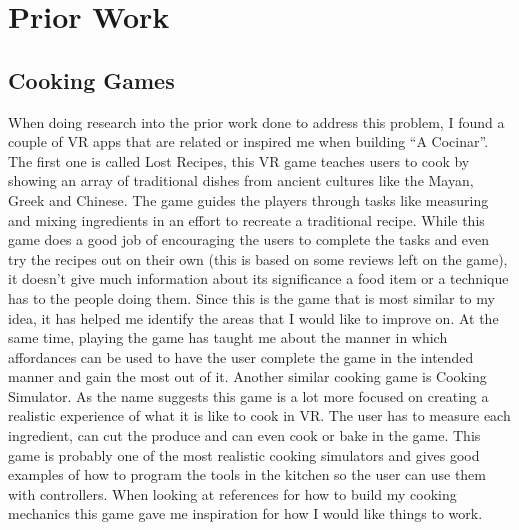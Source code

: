 \documentclass[10pt,twocolumn]{article}
\begin{document}
\section{Prior Work}
\subsection{Cooking Games}
When doing research into the prior work done to address this problem, I found a couple of VR apps that are related or inspired me when building “A Cocinar”. The first one is called Lost Recipes\cite{lostrecipes2022}, this VR game teaches users to cook by showing an array of traditional dishes from ancient cultures like the Mayan, Greek and Chinese. The game guides the players through tasks like measuring and mixing ingredients in an effort to recreate a traditional recipe. While this game does a good job of encouraging the users to complete the tasks and even try the recipes out on their own (this is based on some reviews left on the game), it doesn’t give much information about its significance a food item or a technique has to the people doing them. Since this is the game that is most similar to my idea, it has helped me identify the areas that I would like to improve on. At the same time, playing the game has taught me about the manner in which affordances can be used to have the user complete the game in the intended manner and gain the most out of it. Another similar cooking game is Cooking Simulator\cite{cookingsim2019}. As the name suggests this game is a lot more focused on creating a realistic experience of what it is like to cook in VR. The user has to measure each ingredient, can cut the produce and can even cook or bake in the game. This game is probably one of the most realistic cooking simulators and gives good examples of how to program the tools in the kitchen so the user can use them with controllers. When looking at references for how to build my cooking mechanics this game gave me inspiration for how I would like things to work. 
\end{document}
